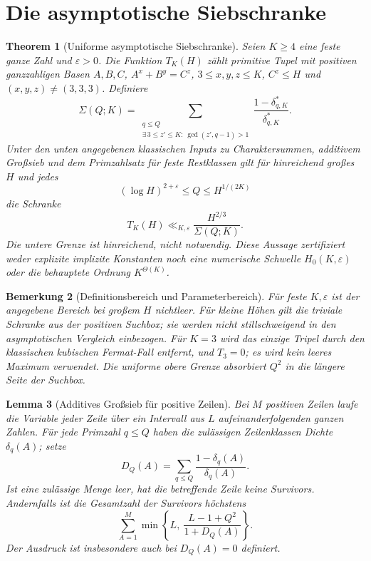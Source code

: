 \documentclass[11pt,a4paper]{article}
\newtheorem{theorem}{Theorem}[section]
\newtheorem{lemma}[theorem]{Lemma}
\newtheorem{remark}[theorem]{Bemerkung}
\begin{document}
\section{Die asymptotische Siebschranke}
\label{sec:sieve}

\begin{theorem}[Uniforme asymptotische Siebschranke]
\label{thm:sieve}
Seien $K\ge4$ eine feste ganze Zahl und $\varepsilon>0$.
Die Funktion $T_K(H)$ zählt primitive Tupel mit
\emph{positiven ganzzahligen} Basen $A,B,C$, $A^x+B^y=C^z$,
$3\le x,y,z\le K$, $C^z\le H$ und $(x,y,z)\ne(3,3,3)$. Definiere
\[
 \Sigma(Q;K)=
 \sum_{\substack{q\le Q\\
      \exists\,3\le z'\le K:\ \gcd(z',q-1)>1}}
       \frac{1-\delta_{q,K}^{*}}{\delta_{q,K}^{*}}.
\]
Unter den unten angegebenen klassischen Inputs zu Charaktersummen,
additivem Großsieb und dem Primzahlsatz für feste Restklassen gilt
für hinreichend großes $H$ und jedes
\[
 (\log H)^{2+\varepsilon}\le Q\le H^{1/(2K)}
\]
die Schranke
\[
 T_K(H)\ll_{K,\varepsilon}\frac{H^{2/3}}{\Sigma(Q;K)}.
\]
Die untere Grenze ist hinreichend, nicht notwendig. Diese Aussage
zertifiziert weder explizite implizite Konstanten noch eine numerische
Schwelle $H_0(K,\varepsilon)$ oder die behauptete Ordnung
$K^{\Theta(K)}$.
\end{theorem}

\begin{remark}[Definitionsbereich und Parameterbereich]
Für feste $K,\varepsilon$ ist der angegebene Bereich bei großem $H$
nichtleer. Für kleine Höhen gilt die triviale Schranke aus der
positiven Suchbox; sie werden nicht stillschweigend in den
asymptotischen Vergleich einbezogen. Für $K=3$ wird das einzige Tripel
durch den klassischen kubischen Fermat-Fall entfernt, und $T_3=0$;
es wird kein leeres Maximum verwendet. Die uniforme obere Grenze
absorbiert $Q^2$ in die längere Seite der Suchbox.
\end{remark}

\begin{lemma}[Additives Großsieb für positive Zeilen]
\label{lem:LS2}
Bei $M$ positiven Zeilen laufe die Variable jeder Zeile über ein
Intervall aus $L$ aufeinanderfolgenden ganzen Zahlen. Für jede
Primzahl $q\le Q$ haben die zulässigen Zeilenklassen Dichte
$\delta_q(A)$; setze
\[
 D_Q(A)=\sum_{q\le Q}\frac{1-\delta_q(A)}{\delta_q(A)}.
\]
Ist eine zulässige Menge leer, hat die betreffende Zeile keine
Survivors. Andernfalls ist die Gesamtzahl der Survivors höchstens
\[
 \sum_{A=1}^{M}\min\left\{L,\
       \frac{L-1+Q^2}{1+D_Q(A)}\right\}.
\]
Der Ausdruck ist insbesondere auch bei $D_Q(A)=0$ definiert.
\end{lemma}
\end{document}
